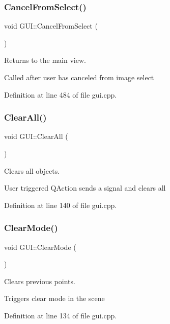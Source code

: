 \subsubsection{\texorpdfstring{Cancel\+From\+Select()}{CancelFromSelect()}}
{\footnotesize\ttfamily void G\+U\+I\+::\+Cancel\+From\+Select (\begin{DoxyParamCaption}{ }\end{DoxyParamCaption})}



Returns to the main view. 

Called after user has canceled from image select 

Definition at line 484 of file gui.\+cpp.

\mbox{\label{classGUI_a19c82a62a2b41460c81317fa967e3a1e}} 
\subsubsection{\texorpdfstring{Clear\+All()}{ClearAll()}}
{\footnotesize\ttfamily void G\+U\+I\+::\+Clear\+All (\begin{DoxyParamCaption}{ }\end{DoxyParamCaption})}



Clears all objects. 

User triggered Q\+Action sends a signal and clears all 

Definition at line 140 of file gui.\+cpp.

\mbox{\label{classGUI_afb6e169c9372800e69c70a3889420325}} 
\subsubsection{\texorpdfstring{Clear\+Mode()}{ClearMode()}}
{\footnotesize\ttfamily void G\+U\+I\+::\+Clear\+Mode (\begin{DoxyParamCaption}{ }\end{DoxyParamCaption})}



Clears previous points. 

Triggers clear mode in the scene 

Definition at line 134 of file gui.\+cpp.

